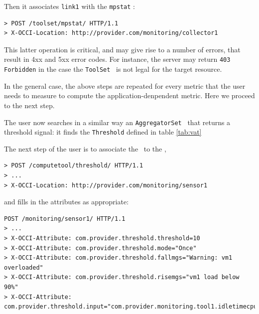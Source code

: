 \documentclass[12pt]{article}  %
\begin{document}
Then it associates {\tt link1} with the {\tt mpstat} \mi:

\begin{verbatim}
> POST /toolset/mpstat/ HTTP/1.1
> X-OCCI-Location: http://provider.com/monitoring/collector1
\end{verbatim}

This latter operation is critical, and may give rise to a number of errors, that result in 4xx and 5xx error codes. For instance, the server may return {\tt 403 Forbidden} in the case the {\tt ToolSet} \mi\ is not legal for the target resource.

In the general case, the above steps are repeated for every metric that the user needs to measure to compute the application-denpendent metric. Here we proceed to the next step. 

The user now searches in a similar way an {\tt AggregatorSet} \mi\ that returns a threshold signal: it finds the {\tt Threshold} defined in table \ref{tab:vat}

\begin{table}
\scriptsize
{}

\caption{Attributes defined for the {\tt threshold} mixin \label{tab:vat}}
\end {table}

The next step of the user is to associate the \sens\ to the \mi,

\begin{verbatim}
> POST /computetool/threshold/ HTTP/1.1
> ...
> X-OCCI-Location: http://provider.com/monitoring/sensor1
\end{verbatim}
 
and fills in the attributes as appropriate:

\begin{verbatim}
POST /monitoring/sensor1/ HTTP/1.1
> ...
> X-OCCI-Attribute: com.provider.threshold.threshold=10
> X-OCCI-Attribute: com.provider.threshold.mode="Once"
> X-OCCI-Attribute: com.provider.threshold.fallmgs="Warning: vm1 overloaded"
> X-OCCI-Attribute: com.provider.threshold.risemgs="vm1 load below 90%"
> X-OCCI-Attribute: com.provider.threshold.input="com.provider.monitoring.tool1.idletimecpu"
\end{verbatim}
\end{document}
